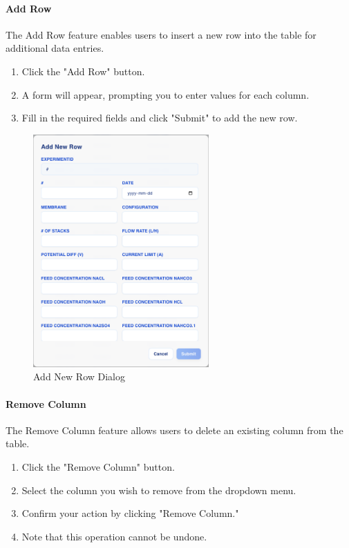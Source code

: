 \documentclass[12pt]{article}
\begin{document}
\paragraph{Add Row}
The Add Row feature enables users to insert a new row into the table for
additional data entries.
\begin{enumerate}
    \item Click the "Add Row" button.
    \item A form will appear, prompting you to enter values for each column.
    \item Fill in the required fields and click "Submit" to add the new row.
\end{enumerate}

\begin{figure}[H]
    \centering
    \includegraphics[width=0.6\textwidth]{./Diagrams/AddRow.png}
    \caption{Add New Row Dialog}
\end{figure}

\paragraph{Remove Column}
The Remove Column feature allows users to delete an existing column from the
table.
\begin{enumerate}
    \item Click the "Remove Column" button.
    \item Select the column you wish to remove from the dropdown menu.
    \item Confirm your action by clicking "Remove Column." 
    \item Note that this operation cannot be undone.
\end{enumerate}
\end{document}
